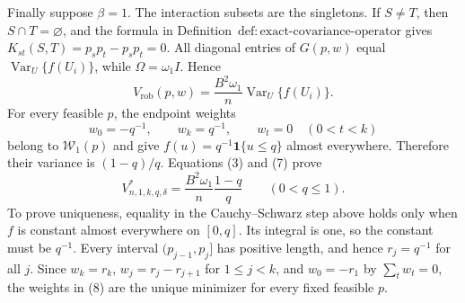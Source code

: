 Finally suppose \(\beta=1\).  The interaction subsets are the singletons.  If \(S\ne T\), then \(S\cap T=\varnothing\), and the formula in Definition~\(\mathrm{def{:}exact\text{-}covariance\text{-}operator}\) gives \(K_{st}(S,T)=p_sp_t-p_sp_t=0\).  All diagonal entries of \(G(p,w)\) equal \(\operatorname{Var}_U\{f(U_i)\}\), while \(\Omega=\omega_1I\).  Hence
\[
V_{\mathrm{rob}}(p,w)=\frac{B^2\omega_1}{n}\operatorname{Var}_U\{f(U_i)\}.
\tag{7}
\]
For every feasible \(p\), the endpoint weights
\[
w_0=-q^{-1},\qquad w_k=q^{-1},\qquad w_t=0\quad(0<t<k)
\tag{8}
\]
belong to \(\mathcal W_1(p)\) and give \(f(u)=q^{-1}\mathbf 1\{u\le q\}\) almost everywhere.  Therefore their variance is \((1-q)/q\).  Equations (3) and (7) prove
\[
V^*_{n,1,k,q,\delta}=\frac{B^2\omega_1}{n}\frac{1-q}{q}
\qquad(0<q\le1).
\tag{9}
\]
To prove uniqueness, equality in the Cauchy--Schwarz step above holds only when \(f\) is constant almost everywhere on \([0,q]\).  Its integral is one, so the constant must be \(q^{-1}\).  Every interval \((p_{j-1},p_j]\) has positive length, and hence \(r_j=q^{-1}\) for all \(j\).  Since \(w_k=r_k\), \(w_j=r_j-r_{j+1}\) for \(1\le j<k\), and \(w_0=-r_1\) by \(\sum_tw_t=0\), the weights in (8) are the unique minimizer for every fixed feasible \(p\).